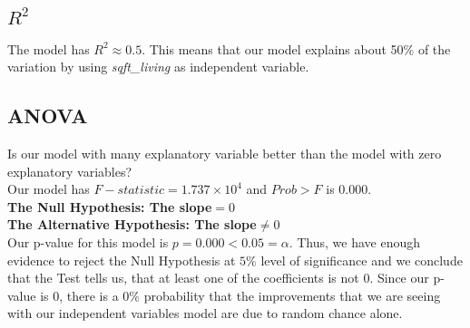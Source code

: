 \documentclass[10pt]{article}
\begin{document}
	\nopagebreak
\subsection*{\textbf{\(R^2 \)}}
The model has \(R^2\approx 0.5\).  This means that our model explains about 50\% of the variation by using {\it sqft\_living} as independent variable.
\subsection*{ANOVA}
Is our model with many explanatory variable better than the model with zero explanatory variables?\\
Our model has \(F-statistic = 1.737\times 10^4\)  and \(Prob > F\) is \(0.000\).\\
\textbf{The Null Hypothesis:   The slope\(=0\)\\
The Alternative Hypothesis: The slope\(\ne 0\)\\
}
Our p-value for this model is \(p=0.000 < 0.05 = \alpha\). Thus, we have enough evidence to reject the Null Hypothesis at $5\%$ level of significance and we conclude that the Test  tells us, that at least one of the coefficients is not $0$. Since our p-value is $0$, there is a $0\%$ probability that the improvements that we are seeing with our independent variables model are due to random chance alone.
\end{document}
